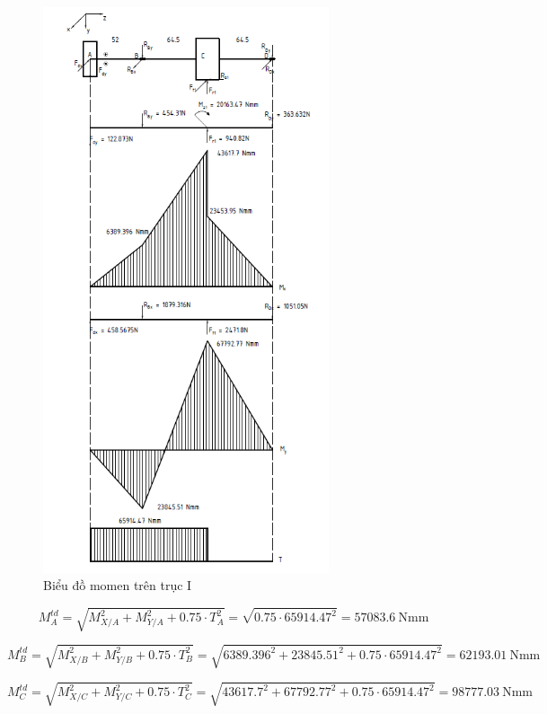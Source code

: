\begin{figure}[H]
    \centering
    \includegraphics[width=0.75\textwidth]{pictures/momen1.png}
    \caption{Biểu đồ momen trên trục I}    
\end{figure}
\begin{equation}
    M_A^{td} 
    = \sqrt{M_{X/A}^2 + M_{Y/A}^2 + 0.75 \cdot T_A^2} 
    = \sqrt{0.75 \cdot 65914.47^2}  
    = 57083.6\ \text{Nmm}
\end{equation}

\[
    M_B^{td} 
    = \sqrt{M_{X/B}^2 + M_{Y/B}^2 + 0.75 \cdot T_B^2} 
    = \sqrt{6389.396^2 + 23845.51^2 + 0.75 \cdot 65914.47^2} 
    = 62193.01\ \text{Nmm}
\]

\[
    M_C^{td} 
    = \sqrt{M_{X/C}^2 + M_{Y/C}^2 + 0.75 \cdot T_C^2} 
    = \sqrt{43617.7^2 + 67792.77^2 + 0.75 \cdot 65914.47^2} 
    = 98777.03\ \text{Nmm}
\]

